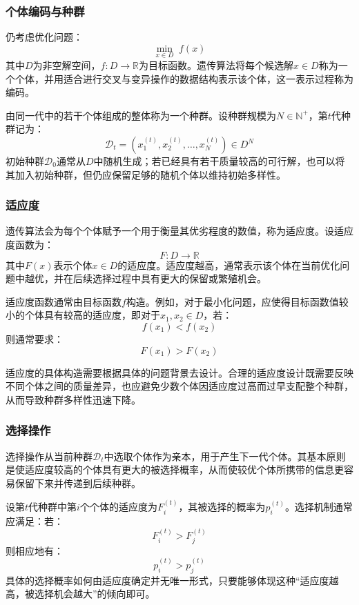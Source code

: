\subsubsection{个体编码与种群}
仍考虑优化问题：
\begin{equation*}
	\min_{x\in D}\;f(x)
\end{equation*}
其中$D$为非空解空间，$f:D\to\mathbb{R}$为目标函数。遗传算法将每个候选解$x\in D$称为一个个体，并用适合进行交叉与变异操作的数据结构表示该个体，这一表示过程称为编码。\par
由同一代中的若干个体组成的整体称为一个种群。设种群规模为$N\in\mathbb{N}^+$，第$t$代种群记为：
\begin{equation*}
	\mathcal{D}_t=\left(x_1^{(t)},x_2^{(t)},\dots,x_N^{(t)}\right)\in D^N
\end{equation*}
初始种群$\mathcal{D}_0$通常从$D$中随机生成；若已经具有若干质量较高的可行解，也可以将其加入初始种群，但仍应保留足够的随机个体以维持初始多样性。
\subsubsection{适应度}
遗传算法会为每个个体赋予一个用于衡量其优劣程度的数值，称为适应度。设适应度函数为：
\begin{equation*}
	F:D\to\mathbb{R}
\end{equation*}
其中$F(x)$表示个体$x\in D$的适应度。适应度越高，通常表示该个体在当前优化问题中越优，并在后续选择过程中具有更大的保留或繁殖机会。\par
适应度函数通常由目标函数$f$构造。例如，对于最小化问题，应使得目标函数值较小的个体具有较高的适应度，即对于$x_1,x_2\in D$，若：
\begin{equation*}
	f(x_1)<f(x_2)
\end{equation*}
则通常要求：
\begin{equation*}
	F(x_1)>F(x_2)
\end{equation*}\par
适应度的具体构造需要根据具体的问题背景去设计。合理的适应度设计既需要反映不同个体之间的质量差异，也应避免少数个体因适应度过高而过早支配整个种群，从而导致种群多样性迅速下降。
\subsubsection{选择操作}
选择操作从当前种群$\mathcal{D}_t$中选取个体作为亲本，用于产生下一代个体。其基本原则是使适应度较高的个体具有更大的被选择概率，从而使较优个体所携带的信息更容易保留下来并传递到后续种群。\par
设第$t$代种群中第$i$个个体的适应度为$F_i^{(t)}$，其被选择的概率为$p_i^{(t)}$。选择机制通常应满足：若：
\begin{equation*}
	F_i^{(t)}>F_j^{(t)}
\end{equation*}
则相应地有：
\begin{equation*}
	p_i^{(t)}>p_j^{(t)}
\end{equation*}
具体的选择概率如何由适应度确定并无唯一形式，只要能够体现这种“适应度越高，被选择机会越大”的倾向即可。
